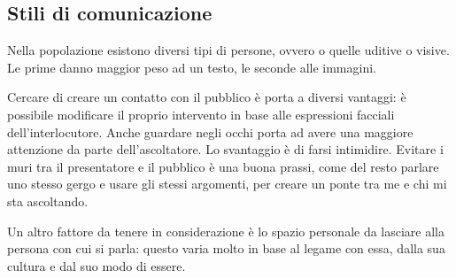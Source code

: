 \subsection{Stili di comunicazione}

Nella popolazione esistono diversi tipi di persone, ovvero o quelle uditive o
visive. Le prime danno maggior peso ad un testo, le seconde alle immagini.

Cercare di creare un contatto con il pubblico è porta a diversi vantaggi: è
possibile modificare il proprio intervento in base alle espressioni facciali
dell'interlocutore. Anche guardare negli occhi porta ad avere una maggiore
attenzione da parte dell'ascoltatore. Lo svantaggio è di farsi intimidire.
Evitare i muri tra il presentatore e il pubblico è una buona prassi, come del
resto parlare uno stesso gergo e usare gli stessi argomenti, per creare un
ponte tra me e chi mi sta ascoltando.

Un altro fattore da tenere in considerazione è lo spazio personale da lasciare
alla persona con cui si parla: questo varia molto in base al legame con essa,
dalla sua cultura e dal suo modo di essere.
